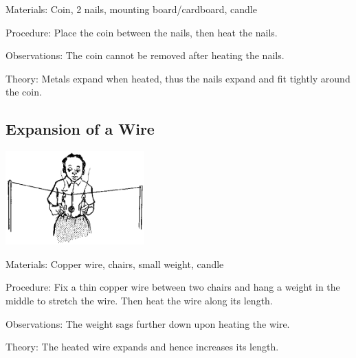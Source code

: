 \begin{multicols}{2}
\begin{description*}
\item[Materials:]{Coin, 2 nails, mounting board/cardboard, candle}
\item[Procedure:]{Place the coin between the nails, then heat the nails.}
\item[Observations:]{The coin cannot be removed after heating the nails.}
\item[Theory:]{Metals expand when heated, thus the nails expand and fit tightly around the coin.}
\end{description*}

\subsection{Expansion of a Wire}

\begin{center}
\includegraphics[width=0.4\textwidth]{./img/source/expansion-wire.png}
\end{center}

\begin{description*}
\item[Materials:]{Copper wire, chairs, small weight, candle}
\item[Procedure:]{Fix a thin copper wire between two chairs and hang a weight in the middle to stretch the wire. Then heat the wire along its length.}
\item[Observations:]{The weight sags further down upon heating the wire.}
\item[Theory:]{The heated wire expands and hence increases its length.}
\end{description*}


\end{multicols}
